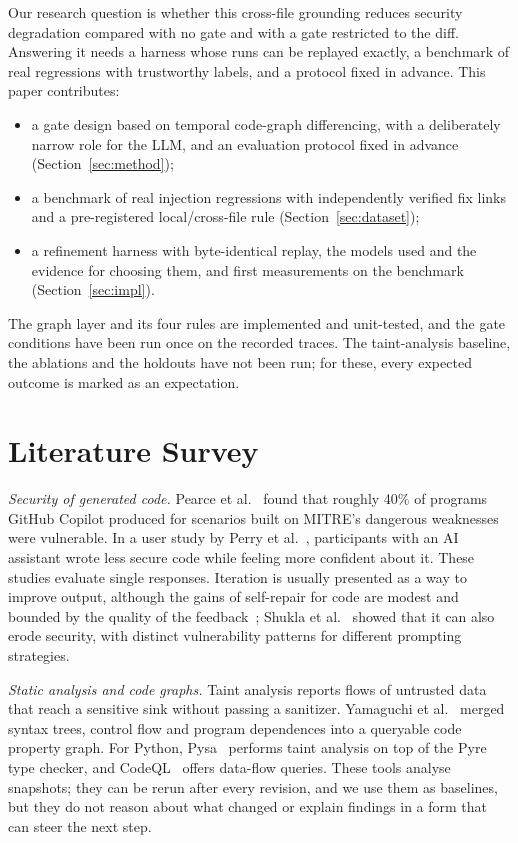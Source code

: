 \documentclass[conference]{IEEEtran}
\begin{document}
Our research question is whether this cross-file grounding reduces security degradation compared with no gate and with a gate restricted to the diff. Answering it needs a harness whose runs can be replayed exactly, a benchmark of real regressions with trustworthy labels, and a protocol fixed in advance. This paper contributes:
\begin{itemize}
\item a gate design based on temporal code-graph differencing, with a deliberately narrow role for the LLM, and an evaluation protocol fixed in advance (Section~\ref{sec:method});
\item a benchmark of real injection regressions with independently verified fix links and a pre-registered local/cross-file rule (Section~\ref{sec:dataset});
\item a refinement harness with byte-identical replay, the models used and the evidence for choosing them, and first measurements on the benchmark (Section~\ref{sec:impl}).
\end{itemize}
The graph layer and its four rules are implemented and unit-tested, and the gate conditions have been run once on the recorded traces. The taint-analysis baseline, the ablations and the holdouts have not been run; for these, every expected outcome is marked as an expectation.

\section{Literature Survey}
\label{sec:survey}

\textit{Security of generated code.} Pearce et al.~\cite{pearce2022asleep} found that roughly 40\% of programs GitHub Copilot produced for scenarios built on MITRE's dangerous weaknesses~\cite{mitrecwe} were vulnerable. In a user study by Perry et al.~\cite{perry2023insecure}, participants with an AI assistant wrote less secure code while feeling more confident about it. These studies evaluate single responses. Iteration is usually presented as a way to improve output, although the gains of self-repair for code are modest and bounded by the quality of the feedback~\cite{olausson2024selfrepair}; Shukla et al.~\cite{shukla2025degradation} showed that it can also erode security, with distinct vulnerability patterns for different prompting strategies.

\textit{Static analysis and code graphs.} Taint analysis reports flows of untrusted data that reach a sensitive sink without passing a sanitizer. Yamaguchi et al.~\cite{yamaguchi2014cpg} merged syntax trees, control flow and program dependences into a queryable code property graph. For Python, Pysa~\cite{pysa} performs taint analysis on top of the Pyre type checker, and CodeQL~\cite{codeql} offers data-flow queries. These tools analyse snapshots; they can be rerun after every revision, and we use them as baselines, but they do not reason about what changed or explain findings in a form that can steer the next step.
\end{document}
